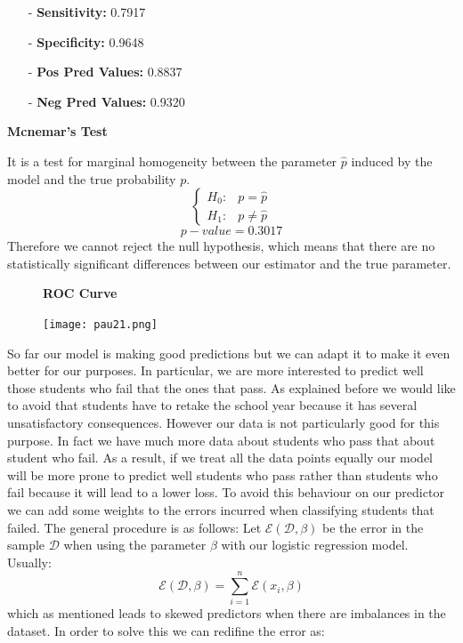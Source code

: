 \documentclass[a4paper, 11pt]{report}
\theoremstyle{definition}
\numberwithin{equation}{section}		%
\numberwithin{table}{section}				%
\begin{document}
\begin{itemize}

    \item[-] \textbf{Sensitivity: } 0.7917
    \item[-] \textbf{Specificity: } 0.9648
    \item[-] \textbf{Pos Pred Values: } 0.8837
    \item[-] \textbf{Neg Pred Values: } 0.9320
\end{itemize}
\begin{center}
    \textbf{Mcnemar's Test}
\end{center}
It is a test for marginal homogeneity between the parameter $\hat{p}$ induced by the model and the true probability $p$.
\begin{equation*}
    \begin{cases}
      H_0:  & p = \hat{p} \\
      H_1:  & p  \neq \hat{p}
    \end{cases}
  \end{equation*}
  \bigskip
$$\boxed{p-value = 0.3017}$$
Therefore we cannot reject the null hypothesis, which means that there are no statistically significant differences between our estimator and the true parameter.
\begin{figure}[h]\centering
\textbf{ROC Curve}\par\medskip
\texttt{[image: pau21.png]}
\end{figure}
\newpage
So far our model is making good predictions but we can adapt it to make it even better for our purposes. In particular, we are more interested to predict well those students who fail that the ones that pass. As explained before we would like to avoid that students have to retake the school year because it has several unsatisfactory consequences. However our data is not particularly good for this purpose. In fact we have much more data about students who pass that about student who fail. As a result, if we treat all the data points equally our model will be more prone to predict well students who pass rather than students who fail because it will lead to a lower loss. To avoid this behaviour on our predictor we can add some weights to the errors incurred when classifying students that failed. The general procedure is as follows:
Let $\mathcal{E}(\mathcal{D}, \beta)$ be the error in the sample $\mathcal{D}$ when using the parameter $\beta$ with our logistic regression model. Usually: $$\mathcal{E}(\mathcal{D}, \beta) = \sum_{i=1}^n\mathcal{E}(x_i, \beta)$$
which as mentioned leads to skewed predictors when there are imbalances in the dataset. In order to solve this we can redifine the error as:
\end{document}

